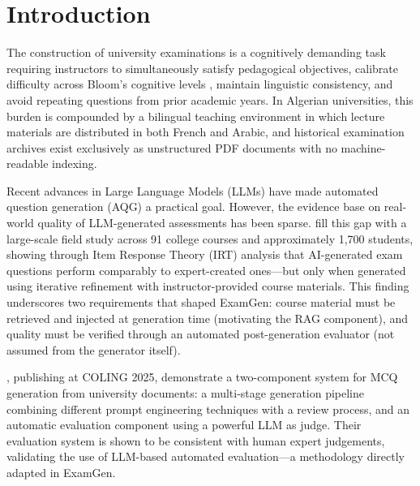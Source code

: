 \documentclass[12pt, a4paper]{article}
\begin{document}
\newpage
\tableofcontents
\newpage
\listoftables
\newpage
\listoffigures

\newpage
{}

\section{Introduction}
\label{sec:intro}

The construction of university examinations is a cognitively demanding task requiring
instructors to simultaneously satisfy pedagogical objectives, calibrate difficulty
across Bloom's cognitive levels \cite{bloom2001}, maintain linguistic consistency, and
avoid repeating questions from prior academic years. In Algerian universities, this
burden is compounded by a bilingual teaching environment in which lecture materials
are distributed in both French and Arabic, and historical examination archives exist
exclusively as unstructured PDF documents with no machine-readable indexing.

Recent advances in Large Language Models (LLMs) have made automated question
generation (AQG) a practical goal. However, the evidence base on real-world quality
of LLM-generated assessments has been sparse. \citet{isley2025quality} fill this
gap with a large-scale field study across 91 college courses and approximately 1,700
students, showing through Item Response Theory (IRT) analysis that AI-generated exam
questions perform comparably to expert-created ones---but only when generated using
iterative refinement with instructor-provided course materials. This finding underscores
two requirements that shaped ExamGen: course material must be retrieved and injected
at generation time (motivating the RAG component), and quality must be verified
through an automated post-generation evaluator (not assumed from the generator itself).

\citet{mucciaccia2025mcq}, publishing at COLING 2025, demonstrate a two-component
system for MCQ generation from university documents: a multi-stage generation
pipeline combining different prompt engineering techniques with a review process,
and an automatic evaluation component using a powerful LLM as judge. Their
evaluation system is shown to be consistent with human expert judgements, validating
the use of LLM-based automated evaluation---a methodology directly adapted in ExamGen.
\end{document}
